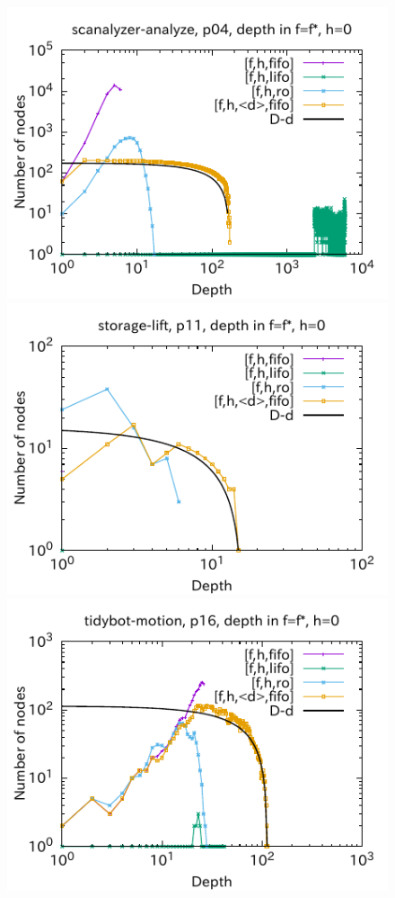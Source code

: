 \begin{figure}[htbp]
\includegraphics{img/output-lmcut/scanalyzer-analyze/p04.pdf}
\includegraphics{img/output-lmcut/storage-lift/p11.pdf}
\includegraphics{img/output-lmcut/tidybot-motion/p16.pdf}

\end{figure}
